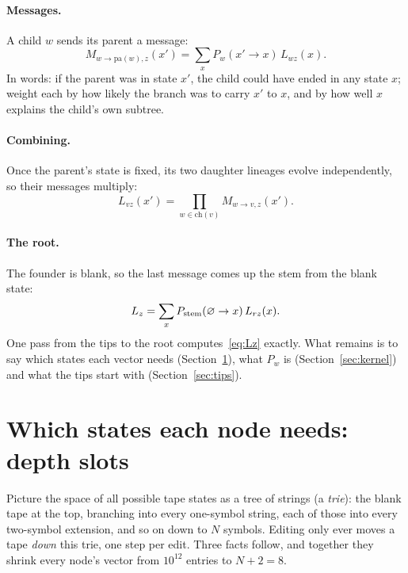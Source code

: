 \documentclass[11pt]{article}
\newcommand{\pa}{\mathrm{pa}}
\newcommand{\ch}{\mathrm{ch}}
\begin{document}
\paragraph{Messages.} A child $w$ sends its parent a message:
\begin{equation}
M_{w\to\pa(w),z}(x')=\sum_{x}P_w(x'\to x)\,L_{wz}(x).
\label{eq:message}
\end{equation}
In words: if the parent was in state $x'$, the child could have ended in any state $x$; weight each by
how likely the branch was to carry $x'$ to $x$, and by how well $x$ explains the child's own subtree.

\paragraph{Combining.} Once the parent's state is fixed, its two daughter lineages evolve
independently, so their messages multiply:
\begin{equation}
L_{vz}(x')=\prod_{w\in\ch(v)}M_{w\to v,z}(x').
\label{eq:combine}
\end{equation}

\paragraph{The root.} The founder is blank, so the last message comes up the stem from the blank
state:
\begin{equation}
L_z=\sum_{x}P_{\rm stem}(\varnothing\to x)\,L_{rz}(x).
\label{eq:root}
\end{equation}
One pass from the tips to the root computes~\eqref{eq:Lz} exactly. What remains is to say which
states each vector needs (Section~\ref{sec:slots}), what $P_w$ is (Section~\ref{sec:kernel}) and what
the tips start with (Section~\ref{sec:tips}).

\section{Which states each node needs: depth slots}\label{sec:slots}

Picture the space of all possible tape states as a tree of strings (a \emph{trie}): the blank tape at
the top, branching into every one-symbol string, each of those into every two-symbol extension, and
so on down to $N$ symbols. Editing only ever moves a tape \emph{down} this trie, one step per edit.
Three facts follow, and together they shrink every node's vector from $10^{12}$ entries to $N+2=8$.
\end{document}
